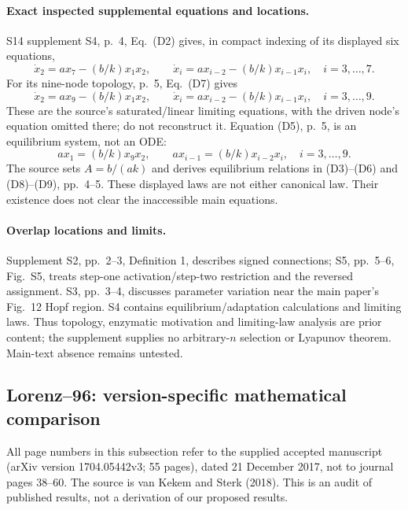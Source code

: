 \paragraph{Exact inspected supplemental equations and locations.}
S14 supplement S4, p.~4, Eq.~(D2) gives, in compact indexing of its displayed
six equations,
\[
 \dot x_2=ax_7-(b/k)x_1x_2,\qquad
 \dot x_i=ax_{i-2}-(b/k)x_{i-1}x_i,\quad i=3,\ldots,7.
\]
For its nine-node topology, p.~5, Eq.~(D7) gives
\[
 \dot x_2=ax_9-(b/k)x_1x_2,\qquad
 \dot x_i=ax_{i-2}-(b/k)x_{i-1}x_i,\quad i=3,\ldots,9.
\]
These are the source's saturated/linear limiting equations, with the driven
node's equation omitted there; do not reconstruct it. Equation (D5), p.~5,
is an equilibrium system, not an ODE:
\[
 ax_1=(b/k)x_9x_2,\qquad
 ax_{i-1}=(b/k)x_{i-2}x_i,\quad i=3,\ldots,9.
\]
The source sets $A=b/(ak)$ and derives equilibrium relations in (D3)--(D6)
and (D8)--(D9), pp.~4--5. These displayed laws are not either canonical law.
Their existence does not clear the inaccessible main equations.

\paragraph{Overlap locations and limits.}
Supplement S2, pp.~2--3, Definition 1, describes signed connections;
S5, pp.~5--6, Fig.~S5, treats step-one activation/step-two restriction and
the reversed assignment. S3, pp.~3--4, discusses parameter variation near
the main paper's Fig.~12 Hopf region. S4 contains equilibrium/adaptation
calculations and limiting laws. Thus topology, enzymatic motivation and
limiting-law analysis are prior content; the supplement supplies no arbitrary-$n$
selection or Lyapunov theorem. Main-text absence remains untested.

\subsection{Lorenz--96: version-specific mathematical comparison}
All page numbers in this subsection refer to the supplied accepted
manuscript (arXiv version 1704.05442v3; 55 pages), dated 21 December 2017, not to journal pages
38--60. The source is van Kekem and Sterk (2018)\cite{vanKekemSterk2018}.
This is an audit of published results, not a derivation of our proposed results.

